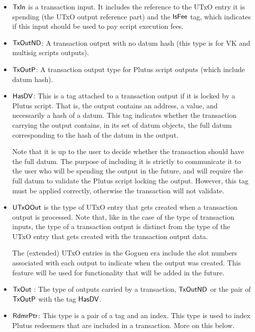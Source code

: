 \begin{itemize}
  \item $\mathsf{TxIn}$ is a transaction input. It includes the reference to the UTxO entry it is spending
  (the UTxO output reference part) and the $\mathsf{IsFee}$ tag, which indicates if this input should
  be used to pay script execution fees.

  \item $\mathsf{TxOutND}$: A transaction output with no datum hash
  (this type is for VK and multisig scripts outputs).

  \item $\mathsf{TxOutP}$: A transaction output type for Plutus
  script outputs (which include datum hash).

  \item $\mathsf{HasDV}$:
  This is a tag attached to a transaction output if it is locked by a Plutus
  script. That is, the output contains an address, a value, and necessarily a
  hash of a datum.
  This tag indicates whether the transaction carrying the output
  contains, in its set of datum objects, the full datum corresponding
  to the hash of the datum in the output.

  Note that it is up to the user
  to decide whether the transaction should have the full datum. The purpose of
  including it is strictly to communicate it to the user who will be spending
  the output in the future, and will require the full datum to validate
  the Plutus script locking the output. However, this tag must be applied
  correctly, otherwise the transaction will not validate.

  \item $\mathsf{UTxOOut}$ is the type of UTxO entry that gets created when a transaction
  output is processed. Note that, like in the case of the type of transaction inputs,
  the type of a transaction output is distinct from the type of the
  UTxO entry that gets created with the transaction output data.

  The (extended) UTxO entries in the Goguen era include the slot numbers associated with each output
  to indicate when the output was created.
  This feature will be used for functionality that will be added in the future.

  \item $\mathsf{TxOut}$ : The type of outputs carried by a transaction,
  $\mathsf{TxOutND}$ or the pair of $\mathsf{TxOutP}$ with the tag $\mathsf{HasDV}$.

  \item $\mathsf{RdmrPtr}$: This type is a pair of a tag and an index. This type is
  used to index Plutus redeemers that are included in a transaction. More on this
  below.

\end{itemize}


